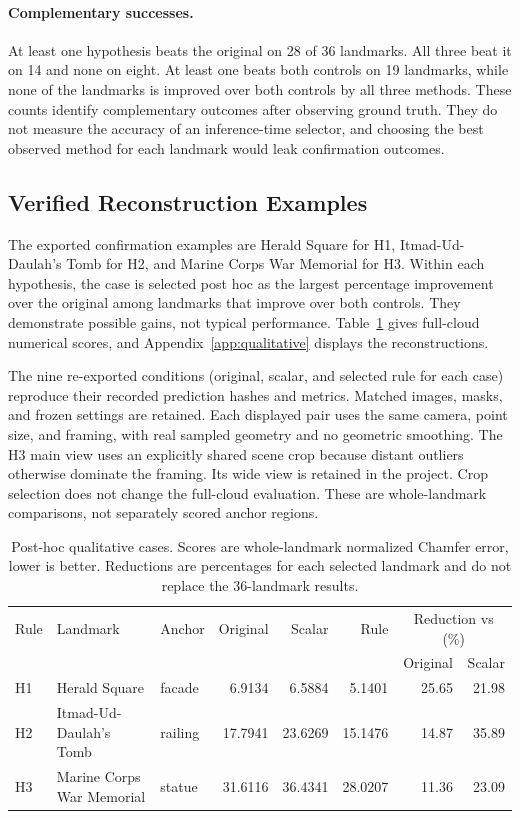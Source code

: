 \paragraph{Complementary successes.}
At least one hypothesis beats the original on 28 of 36 landmarks. All three beat it on 14 and none on eight. At least one beats both controls on 19 landmarks, while none of the landmarks is improved over both controls by all three methods. These counts identify complementary outcomes after observing ground truth. They do not measure the accuracy of an inference-time selector, and choosing the best observed method for each landmark would leak confirmation outcomes.

\subsection{Verified Reconstruction Examples}
\label{sec:qualitative-summary}
The exported confirmation examples are Herald Square for H1, Itmad-Ud-Daulah's Tomb for H2, and Marine Corps War Memorial for H3. Within each hypothesis, the case is selected post hoc as the largest percentage improvement over the original among landmarks that improve over both controls. They demonstrate possible gains, not typical performance. Table~\ref{tab:qualitative-cases} gives full-cloud numerical scores, and Appendix~\ref{app:qualitative} displays the reconstructions.

The nine re-exported conditions (original, scalar, and selected rule for each case) reproduce their recorded prediction hashes and metrics. Matched images, masks, and frozen settings are retained. Each displayed pair uses the same camera, point size, and framing, with real sampled geometry and no geometric smoothing. The H3 main view uses an explicitly shared scene crop because distant outliers otherwise dominate the framing. Its wide view is retained in the project. Crop selection does not change the full-cloud evaluation. These are whole-landmark comparisons, not separately scored anchor regions.

\begin{table}[t]
\caption{Post-hoc qualitative cases. Scores are whole-landmark normalized Chamfer error, lower is better. Reductions are percentages for each selected landmark and do not replace the 36-landmark results.}
\label{tab:qualitative-cases}
\centering
\small
\begin{tabular}{lllrrrrr}
\toprule
Rule & Landmark & Anchor & Original & Scalar & Rule & \multicolumn{2}{c}{Reduction vs (\%)}\\
 & & & & & & Original & Scalar\\
\midrule
H1 & Herald Square & facade & 6.9134 & 6.5884 & 5.1401 & 25.65 & 21.98\\
H2 & Itmad-Ud-Daulah's Tomb & railing & 17.7941 & 23.6269 & 15.1476 & 14.87 & 35.89\\
H3 & Marine Corps War Memorial & statue & 31.6116 & 36.4341 & 28.0207 & 11.36 & 23.09\\
\bottomrule
\end{tabular}
\end{table}
